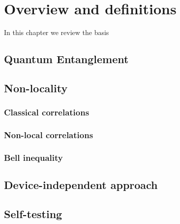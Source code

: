 \chapter{Overview and definitions}

In this chapter we review the basis 

\section{Quantum Entanglement}

\section{Non-locality}

\subsection{Classical correlations}

\subsection{Non-local correlations}

\subsection{Bell inequality}

\section{Device-independent approach}

\section{Self-testing}
